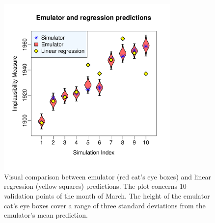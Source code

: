 \documentclass[a4paper, 12pt]{article}
\begin{document}
\begin{figure}
\centering
 \includegraphics[width=0.8\textwidth]{Validation_Plots/Comparison_LR/LR_Mar_111-120}
 \caption{Visual comparison between emulator (red cat's eye boxes) and linear regression (yellow squares) predictions. The plot concerns 10 validation points of the month of March. The height of the emulator cat's eye boxes cover a range of three standard deviations from the emulator's mean prediction.}
 \label{Fig_Comparison_LR}
\end{figure}
\end{document}
